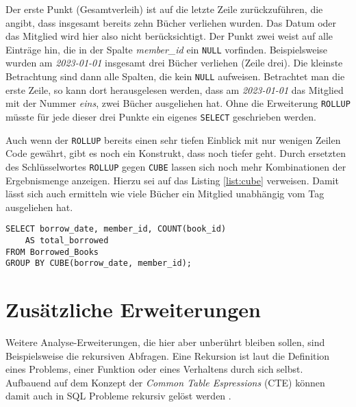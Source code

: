 Der erste Punkt (Gesamtverleih) ist auf die letzte Zeile zurückzuführen, die
angibt, dass insgesamt bereits zehn Bücher verliehen wurden. Das Datum oder das
Mitglied wird hier also nicht berücksichtigt. Der Punkt zwei weist auf alle Einträge
hin, die in der Spalte \textit{member\_id} ein \texttt{NULL} vorfinden. Beispielsweise
wurden am \textit{2023-01-01} insgesamt drei Bücher verliehen (Zeile drei). Die kleinste
Betrachtung sind dann alle Spalten, die kein \texttt{NULL} aufweisen. Betrachtet
man die erste Zeile, so kann dort herausgelesen werden, dass am \textit{2023-01-01}
das Mitglied mit der Nummer \textit{eins}, zwei Bücher ausgeliehen hat. Ohne die
Erweiterung \texttt{ROLLUP} müsste für jede dieser drei Punkte ein eigenes \texttt{SELECT}
geschrieben werden.

Auch wenn der \texttt{ROLLUP} bereits einen sehr tiefen Einblick mit nur wenigen
Zeilen Code gewährt, gibt es noch ein Konstrukt, dass noch tiefer geht. Durch
ersetzten des Schlüsselwortes \texttt{ROLLUP} gegen \texttt{CUBE} lassen sich
noch mehr Kombinationen der Ergebnismenge anzeigen. Hierzu sei auf das Listing \ref{list:cube}
verweisen. Damit lässt sich auch ermitteln wie viele Bücher ein Mitglied
unabhängig vom Tag ausgeliehen hat.

\begin{lstlisting}[caption={Beispiel eines \texttt{CUBE}}, label={list:cube}]
SELECT borrow_date, member_id, COUNT(book_id)
	AS total_borrowed
FROM Borrowed_Books
GROUP BY CUBE(borrow_date, member_id);
\end{lstlisting}

\section{Zusätzliche Erweiterungen}
\label{sec:zus_erweiterungen} Weitere Analyse-Erweiterungen, die hier aber
unberührt bleiben sollen, sind Beispielsweise die rekursiven Abfragen. Eine
Rekursion ist laut \citet{benecke1998rekursion} die Definition eines Problems,
einer Funktion oder eines Verhaltens durch sich selbst. Aufbauend auf dem Konzept
der \textit{Common Table Espressions} (CTE) können damit auch in SQL Probleme
rekursiv gelöst werden \citep[vgl.][]{Ignacio2022}.